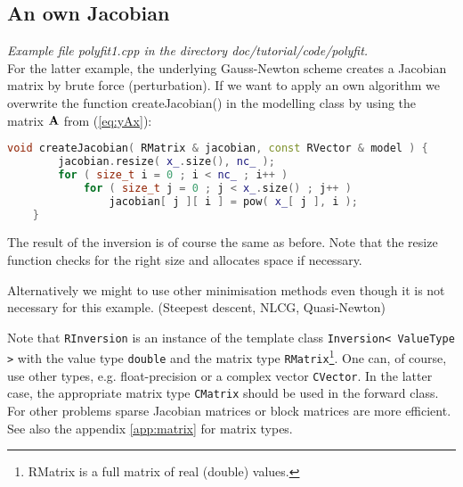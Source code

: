 \subsection{An own Jacobian}
{\em Example file polyfit1.cpp in the directory doc/tutorial/code/polyfit.}\\
For the latter example, the underlying Gauss-Newton scheme creates a Jacobian matrix by brute force (perturbation).
If we want to apply an own algorithm we overwrite the function createJacobian() in the modelling class by using the matrix $\mathbf{A}$ from (\ref{eq:yAx}):
\begin{lstlisting}[language=C++,morekeywords={RMatrix,RVector,size_t}]
    void createJacobian( RMatrix & jacobian, const RVector & model ) {
        jacobian.resize( x_.size(), nc_ );
        for ( size_t i = 0 ; i < nc_ ; i++ )
            for ( size_t j = 0 ; j < x_.size() ; j++ )
                jacobian[ j ][ i ] = pow( x_[ j ], i );
    }
\end{lstlisting}

The result of the inversion is of course the same as before.
Note that the resize function checks for the right size and allocates space if necessary.

Alternatively we might to use other minimisation methods even though it is not necessary for this example.
\sperre (Steepest descent, NLCG, Quasi-Newton)

Note that \lstinline|RInversion| is an instance of the template class \lstinline|Inversion< ValueType >| with the value type \lstinline|double| and the matrix type \lstinline|RMatrix|\footnote{RMatrix is a full matrix of real (double) values.}.
One can, of course, use other types, e.g. float-precision or a complex vector \lstinline|CVector|.
In the latter case, the appropriate matrix type \lstinline|CMatrix| should be used in the forward class. 
For other problems sparse Jacobian matrices or block matrices are more efficient.
See also the appendix \ref{app:matrix} for matrix types.

